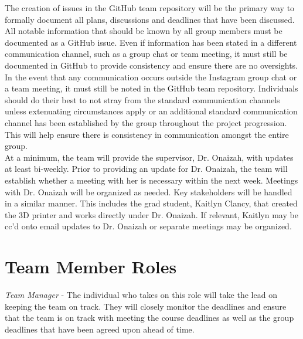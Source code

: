 \documentclass{article}
\begin{document}
The creation of issues in the GitHub team repository will be the primary way to formally document all plans,
discussions and deadlines that have been discussed. All notable information that should be known by all group
members must be documented as a GitHub issue. Even if information has been stated in a different communication channel,
such as a group chat or team meeting, it must still be documented in GitHub to provide consistency and ensure there
are no oversights.\\

In the event that any communication occurs outside the Instagram group chat or a team meeting, it must still be
noted in the GitHub team repository. Individuals should do their best to not stray from the standard communication
channels unless extenuating circumstances apply or an additional standard communication channel has been established
by the group throughout the project progression. This will help ensure there is consistency in communication amongst
the entire group.\\

At a minimum, the team will provide the supervisor, Dr. Onaizah, with updates at least bi-weekly. Prior to providing
an update for Dr. Onaizah, the team will establish whether a meeting with her is necessary within the next week.
Meetings with Dr. Onaizah will be organized as needed. Key stakeholders will be handled in a similar manner. This
includes the grad student, Kaitlyn Clancy, that created the 3D printer and works directly under Dr. Onaizah. If relevant, Kaitlyn 
may be cc’d onto email updates to Dr. Onaizah or separate meetings may be organized.

\section{Team Member Roles}

\iffalse
\wss{You should identify the types of roles you anticipate, like notetaker,
leader, meeting chair, reviewer.  Assigning specific people to those roles is
not necessary at this stage.  In a student team the role of the individuals will
likely change throughout the year.}
\fi

\textit{Team Manager} - The individual who takes on this role will take the lead on keeping the team on track. They
will closely monitor the deadlines and ensure that the team is on track with meeting the course deadlines as well as
the group deadlines that have been agreed upon ahead of time.\\
\end{document}
